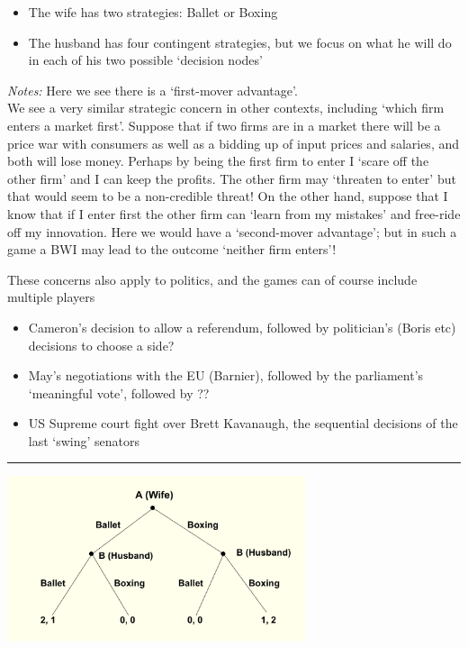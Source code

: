 \documentclass[]{article}
\providecommand{\tightlist}{%
  \setlength{\itemsep}{0pt}\setlength{\parskip}{0pt}}
\begin{document}
\begin{itemize}
\tightlist
\item
  The wife has two strategies: Ballet or Boxing
\item
  The husband has four contingent strategies, but we focus on what he
  will do in each of his two possible `decision nodes'
\end{itemize}

\emph{Notes:} Here we see there is a `first-mover advantage'.\\

We see a very similar strategic concern in other contexts, including
`which firm enters a market first'. Suppose that if two firms are in a
market there will be a price war with consumers as well as a bidding up
of input prices and salaries, and both will lose money. Perhaps by being
the first firm to enter I `scare off the other firm' and I can keep the
profits. The other firm may `threaten to enter' but that would seem to
be a non-credible threat! On the other hand, suppose that I know that if
I enter first the other firm can `learn from my mistakes' and free-ride
off my innovation. Here we would have a `second-mover advantage'; but in
such a game a BWI may lead to the outcome `neither firm enters'!

These concerns also apply to politics, and the games can of course
include multiple players

\begin{itemize}
\item
  Cameron's decision to allow a referendum, followed by politician's
  (Boris etc) decisions to choose a side?
\item
  May's negotiations with the EU (Barnier), followed by the parliament's
  `meaningful vote', followed by ??
\item
  US Supreme court fight over Brett Kavanaugh, the sequential decisions
  of the last `swing' senators
\end{itemize}

\begin{center}\rule{0.5\linewidth}{\linethickness}\end{center}

\includegraphics[height=1.9in]{picsfigs/BOS_sequential.png}
\end{document}
